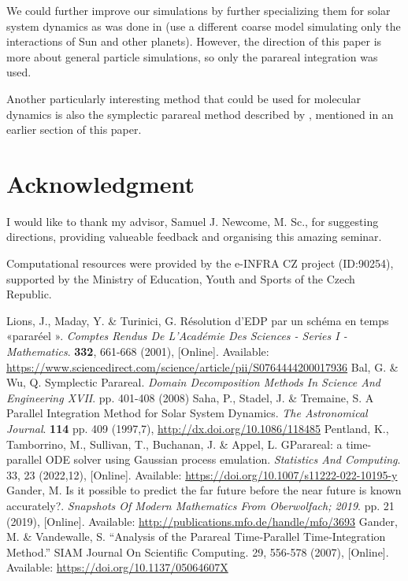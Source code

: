 \documentclass[conference]{IEEEtran}
\begin{document}
We could further improve our simulations by further specializing them for solar system dynamics as was done in \cite{parallelsolar} (use a different coarse model simulating only the interactions of Sun and other planets). However, the direction of this paper is more about general particle simulations, so only the parareal integration was used.

Another particularly interesting method that could be used for molecular dynamics is also the symplectic parareal method described by \cite{symplecticparareal}, mentioned in an earlier section of this paper.

\section*{Acknowledgment}

I would like to thank my advisor, Samuel J. Newcome, M. Sc., for suggesting directions, providing valueable feedback and organising this amazing seminar.

Computational resources were provided by the e-INFRA CZ project (ID:90254),
supported by the Ministry of Education, Youth and Sports of the Czech Republic.

\begin{thebibliography}{00}
Lions, J., Maday, Y. \& Turinici, G. Résolution d'EDP par un schéma en temps «pararéel ». {\em Comptes Rendus De L'Académie Des Sciences - Series I - Mathematics}. \textbf{332}, 661-668 (2001), [Online]. Available: \url{https://www.sciencedirect.com/science/article/pii/S0764444200017936}
Bal, G. \& Wu, Q. Symplectic Parareal. {\em Domain Decomposition Methods In Science And Engineering XVII}. pp. 401-408 (2008)
Saha, P., Stadel, J. \& Tremaine, S. A Parallel Integration Method for Solar System Dynamics. {\em The Astronomical Journal}. \textbf{114} pp. 409 (1997,7), \url{http://dx.doi.org/10.1086/118485}
Pentland, K., Tamborrino, M., Sullivan, T., Buchanan, J. \& Appel, L. GParareal: a time-parallel ODE solver using Gaussian process emulation. {\em Statistics And Computing}. 33, 23 (2022,12), [Online]. Available: \url{https://doi.org/10.1007/s11222-022-10195-y}
Gander, M. Is it possible to predict the far future before the near future is known accurately?. {\em Snapshots Of Modern Mathematics From Oberwolfach; 2019}. pp. 21 (2019), [Online]. Available: \url{http://publications.mfo.de/handle/mfo/3693}
Gander, M. \& Vandewalle, S. ``Analysis of the Parareal Time‐Parallel Time‐Integration Method.'' SIAM Journal On Scientific Computing. 29, 556-578 (2007), [Online]. Available: \url{https://doi.org/10.1137/05064607X}
\end{thebibliography}
\end{document}
